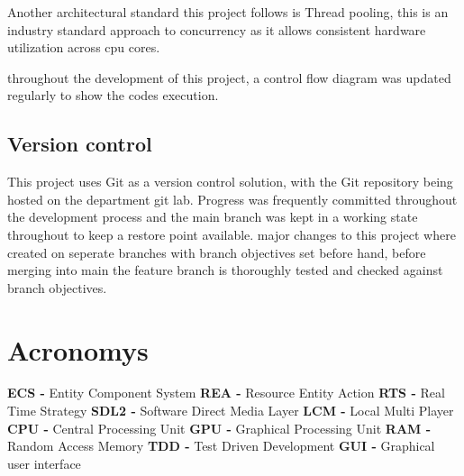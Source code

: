 \documentclass[]{final_report}
\begin{document}
Another architectural standard this project follows is Thread pooling, this is an industry standard approach to concurrency as it allows consistent hardware utilization across cpu cores. 

throughout the development of this project, a control flow diagram was updated regularly to show the codes execution.

\section{Version control}
This project uses Git as a version control solution, with the Git repository being hosted on the department git lab. Progress was frequently committed throughout the development process and the main branch was kept in a working state throughout to keep a restore point available. major changes to this project where created on seperate branches with branch objectives set before hand, before merging into main the feature branch is thoroughly tested and checked against branch objectives.
\newpage
\chapter{Acronomys}
\textbf{ECS - }Entity Component System \newline
\textbf{REA - }Resource Entity Action \newline
\textbf{RTS - }Real Time Strategy \newline
\textbf{SDL2 - }Software Direct Media Layer \newline
\textbf{LCM - }Local Multi Player \newline
\textbf{CPU - }Central Processing Unit \newline
\textbf{GPU - }Graphical Processing Unit \newline
\textbf{RAM - }Random Access Memory \newline
\textbf{TDD - }Test Driven Development \newline
\textbf{GUI - }Graphical user interface \newline
\newpage
\end{document}
